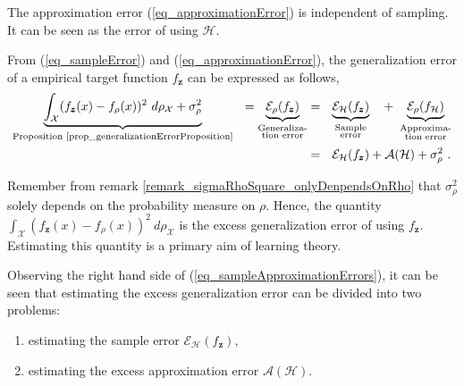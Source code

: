 \begin{remark} \label{remark_aproximationError}
  The approximation error (\ref{eq_approximationError}) is independent of sampling. It can be seen as the error of using $\mathcal{H}$. %
\end{remark}

\begin{remark}  
  From (\ref{eq_sampleError}) and (\ref{eq_approximationError}), the generalization error of a empirical target function $f_{\pmb{z}}$ can be expressed as follows,
\begin{equation} \label{eq_sampleApproximationErrors}
    \begin{aligned}
      \underbrace{\int_{\mathcal{X}} (f_{\pmb{z}}(x) - f_{\rho}(x))^2 \ d\rho_{\mathcal{X}} + \sigma_{\rho}^2}_
                  {\text{Proposition \ref{prop_generalizationErrorProposition}}} \ \
      = \underbrace{\mathcal{E}_{\rho}(f_{\pmb{z}})}_{\substack{\text{Generaliza-} \\ \text{tion error}}} 
           &=  \ \ \underbrace{\mathcal{E}_{\mathcal{H}}(f_{\pmb{z}})}_{\substack{\text{Sample} \\ \text{error}}} \ \ \ +  \
                  \underbrace{\mathcal{E}_{\rho}(f_{\mathcal{H}})}_{\substack{\text{Approxima-} \\ \text{tion error}}} \\
           &= \ \ \mathcal{E}_{\mathcal{H}}(f_{\pmb{z}}) + 
                  \mathcal{A}(\mathcal{H}) + \sigma_{\rho}^2 \ .
      \end{aligned}   
  \end{equation}
\end{remark}

Remember from remark \ref{remark_sigmaRhoSquare_onlyDenpendsOnRho} that $\sigma_{\rho}^2$ solely depends on the probability measure on $\rho$. Hence, the quantity $\int_{\mathcal{X}} (f_{\pmb{z}}(x) - f_{\rho}(x))^2 \ d\rho_{\mathcal{X}}$ is the excess generalization error of using $f_{\pmb{z}}$. Estimating this quantity is a primary aim of learning theory. %

Observing the right hand side of (\ref{eq_sampleApproximationErrors}), it can be seen that estimating the excess generalization error can be divided into two problems: 
\begin{enumerate}
  \item estimating the sample error $\mathcal{E}_{\mathcal{H}}(f_{\pmb{z}})$,
  \item estimating the excess approximation error $\mathcal{A}(\mathcal{H})$.
\end{enumerate}

